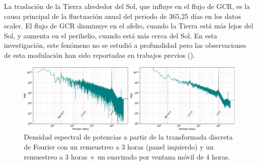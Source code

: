 La traslación de la Tierra alrededor del Sol, que influye en el flujo de GCR, es la causa principal de la fluctuación anual del periodo de 365,25 días en los datos scaler. El flujo de GCR disminuye en el afelio, cuando la Tierra está más lejos del Sol, y aumenta en el perihelio, cuando está más cerca del Sol. En esta investigación, este fenómeno no se estudió a profundidad pero las observaciones de esta modulación han sido reportadas en trabajos previos (\cite{grieder_2001}).
\begin{figure}
\centering
\includegraphics[width=1\linewidth]{Figs/Figr/PSD_FFT.pdf}
    \caption{Densidad espectral de potencias a partir de la transformada discreta de Fourier con un remeustreo a 3 horas (panel izquierdo) y un remuestreo a 3 horas + un suavizado por ventana móvil de 4 horas.}
    \label{FFT1}
\end{figure}

%
%
